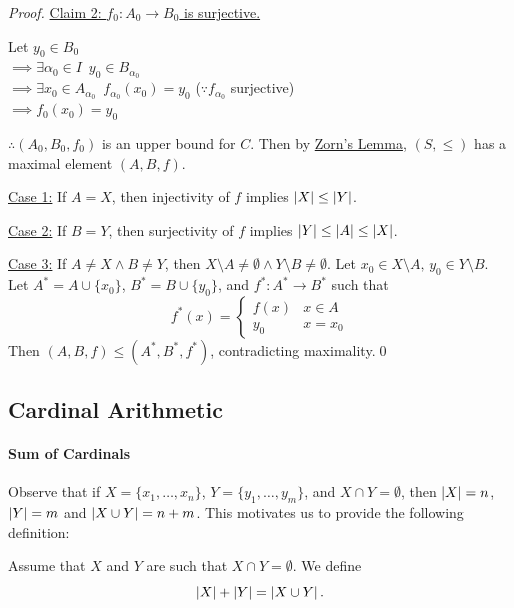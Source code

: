 \documentclass[notoc,notitlepage]{tufte-book}
\begin{document}
\begin{proof}
  \noindent\underline{Claim 2: $f_0 : A_0 \to B_0$ is surjective.}

  Let $y_0 \in B_0$ \\
  \noindent $\implies \exists \alpha_0 \in I \enspace y_0 \in B_{\alpha_0}$ \\
  \noindent $\implies \exists x_0 \in A_{\alpha_0} \enspace f_{\alpha_0}(x_0) = y_0$ ($\because f_{\alpha_0}$ surjective) \\
  \noindent $\implies f_0(x_0) = y_0$

  $\therefore (A_0, B_0, f_0)$ is an upper bound for $C$. Then by \hyperref[axiom:zorn_s_lemma]{Zorn's Lemma}, $(S, \leq)$ has a maximal element $(A, B, f)$.

  \noindent\underline{Case 1:} If $A = X$, then injectivity of $f$ implies $\left|X\right| \leq \left|Y\right|$.
  
  \noindent\underline{Case 2:} If $B = Y$, then surjectivity of $f$ implies $\left|Y\right| \leq \left|A\right| \leq \left|X\right|$.

  \noindent\underline{Case 3:} If $A \neq X \land B \neq Y$, then $X \setminus A \neq \emptyset \land Y \setminus B \neq \emptyset$. Let $x_0 \in X \setminus A, \, y_0 \in Y \setminus B$. Let $A^* = A \cup \{x_0\}$, $B^* = B \cup \{ y_0 \}$, and $f^* : A^* \to B^*$ such that
  \begin{equation*}
    f^*(x) = \begin{cases}
      f(x) & x \in A \\
      y_0  & x = x_0
    \end{cases}
  \end{equation*}
  Then $(A, B, f) \leq (A^*, B^*, f^*)$, contradicting maximality.\qed
\end{proof}

\subsection{Cardinal Arithmetic}%
\label{sub:cardinal_arithmetic}

\paragraph{Sum of Cardinals} Observe that if $X = \{ x_1, \ldots, x_n\}$, $Y = \{ y_1, \ldots, y_m\}$, and $X \cap Y = \emptyset$, then $\left|X\right| = n$, $\left|Y\right| = m$ and $\left|X \cup Y\right| = n + m$. This motivates us to provide the following definition:

\begin{defn}\label{defn:sum_of_cardinals}
  Assume that $X$ and $Y$ are such that $X \cap Y = \emptyset$. We define
  \begin{equation*}
    \left|X\right| + \left|Y\right| = \left|X \cup Y\right|.
  \end{equation*}
\end{defn}
\end{document}
